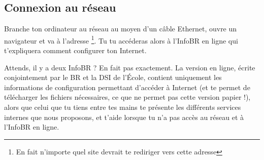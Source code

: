 
\subsection{Connexion au réseau}

Branche ton ordinateur au réseau au moyen d'un câble Ethernet, ouvre un navigateur et va à l'adresse \footnote{En fait n'importe quel site devrait te rediriger vers cette adresse}. Tu tu accéderas alors à l'InfoBR en ligne qui t'expliquera comment configurer ton Internet.

Attends, il y a deux InfoBR ? En fait pas exactement. La version en ligne, écrite conjointement par le BR et la DSI de l'École,  contient uniquement les informations de configuration permettant d'accéder à Internet (et te permet de télécharger les fichiers nécessaires, ce que ne permet pas cette version papier !), alors que celui que tu tiens entre tes mains te présente les différents services internes que nous proposons, et t'aide lorsque tu n'a pas accès au réseau et à l'InfoBR en ligne.
